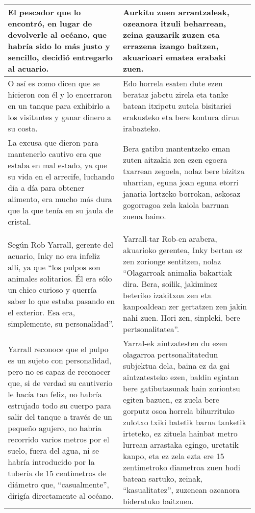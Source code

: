 \documentclass{article}
\begin{document}
\begin{center}
\begin{longtable}{|p{6cm}|p{6cm}|}
  \midrule
  El pescador que lo encontró, en lugar de devolverle al océano, que habría sido lo más justo y sencillo, decidió entregarlo al acuario.&
  Aurkitu zuen arrantzaleak, ozeanora itzuli beharrean, zeina gauzarik zuzen eta errazena izango baitzen, akuarioari ematea erabaki zuen.\\

  \midrule
  O así es como dicen que se hicieron con él y lo encerraron en un tanque para exhibirlo a los visitantes y ganar dinero a su costa.&
  Edo horrela esaten dute ezen berataz jabetu zirela eta tanke batean itxipetu zutela bisitariei erakusteko eta bere kontura dirua irabazteko.\\

  \midrule
  La excusa que dieron para mantenerlo cautivo era que estaba en mal estado, ya que su vida en el arrecife, luchando día a día para obtener alimento, era mucho más dura que la que tenía en su jaula de cristal.&
  Bera gatibu mantentzeko eman zuten aitzakia zen ezen egoera txarrean zegoela, nolaz bere bizitza uharrian, eguna joan eguna etorri janaria lortzeko borrokan, askosaz gogorragoa zela kaiola barruan zuena baino.\\

  \midrule
  \cellcolor{lightgray}{\textbf{Párrafo}} &
  \cellcolor{lightgray}{\textbf{Paragrafoa}}\\
  
  \midrule
  Según Rob Yarrall, gerente del acuario, Inky no era infeliz allí, ya que ``los pulpos son animales solitarios. Él era sólo un chico curioso y querría saber lo que estaba pasando en el exterior. Esa era, simplemente, su personalidad''.&
  Yarrall-tar Rob-en arabera, akuarioko gerentea, Inky bertan ez zen zorionge sentitzen, nolaz ``Olagarroak animalia bakartiak dira. Bera, soilik, jakiminez beteriko izakitxoa zen eta kanpoaldean zer gertatzen zen jakin nahi zuen. Hori zen, sinpleki, bere pertsonalitatea''.\\

  \midrule
  Yarrall reconoce que el pulpo es un sujeto con personalidad, pero no es capaz de reconocer que, si de verdad su cautiverio le hacía tan feliz, no habría estrujado todo su cuerpo para salir del tanque a través de un pequeño agujero, no habría recorrido varios metros por el suelo, fuera del agua, ni se habría introducido por la tubería de 15 centímetros de diámetro que, ``casualmente'', dirigía directamente al océano.&
  Yarral-ek aintzatesten du ezen olagarroa pertsonalitatedun subjektua dela, baina ez da gai aintzatesteko ezen, baldin egiatan bere gatibutasunak hain zoriontsu egiten bazuen, ez zuela bere gorputz osoa horrela bihurrituko zulotxo txiki batetik barna tanketik irteteko, ez zituela hainbat metro lurrean arrastaka egingo, uretatik kanpo, eta ez zela ezta ere 15 zentimetroko diametroa zuen hodi batean sartuko, zeinak, ``kasualitatez'', zuzenean ozeanora bideratuko baitzuen.\\


\end{longtable}
\end{center}
\end{document}
